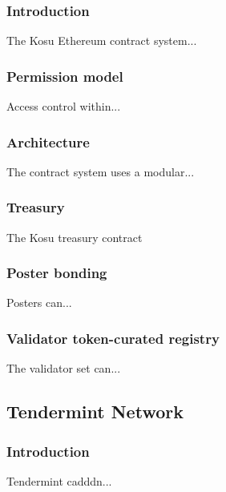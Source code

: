 \documentclass[9pt]{article}
\begin{document}
\subsubsection{Introduction}\label{ethereum-contract-system-intro}
\noindent The Kosu Ethereum contract system...
\bigskip

\subsubsection{Permission model}\label{ethereum-contract-system-auth}
\noindent Access control within...
\bigskip

\subsubsection{Architecture}\label{ethereum-contract-system-architecture}
\noindent The contract system uses a modular... 
\bigskip

\subsubsection{Treasury}\label{ethereum-contract-system-treasury}
\noindent The Kosu treasury contract
\bigskip

\subsubsection{Poster bonding}\label{ethereum-contract-system-poster-bonding}
\noindent Posters can...
\bigskip

\subsubsection{Validator token-curated registry}\label{ethereum-contract-system-tcr}
\noindent The validator set can...

\subsection{Tendermint Network}\label{tm-network}
\subsubsection{Introduction}\label{tm-network-intro}
\noindent Tendermint cadddn...
\bigskip
\end{document}

